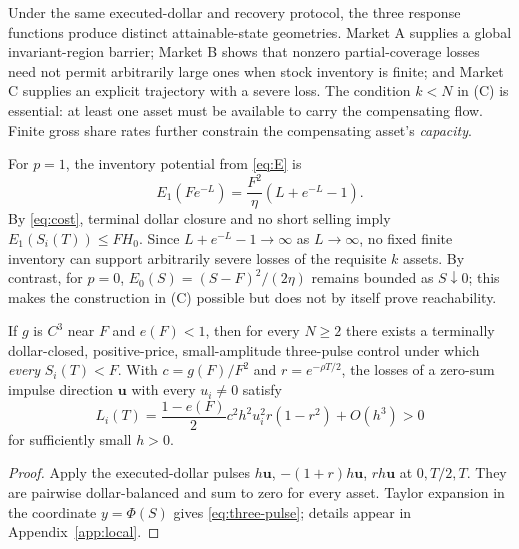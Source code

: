 \documentclass[review,hidelinks,onefignum,onetabnum]{siamonline250211}
\begin{document}
Under the same executed-dollar and recovery protocol, the three response functions produce distinct attainable-state geometries. Market A supplies a global invariant-region barrier; Market B shows that nonzero partial-coverage losses need not permit arbitrarily large ones when stock inventory is finite; and Market C supplies an explicit trajectory with a severe loss. The condition $k<N$ in (C) is essential: at least one asset must be available to carry the compensating flow. Finite gross share rates further constrain the compensating asset's \emph{capacity}.

For $p=1$, the inventory potential from \eqref{eq:E} is
\begin{equation}\label{eq:inventoryb}
E_1(Fe^{-L})=\frac{F^2}{\eta}\left(L+e^{-L}-1\right).
\end{equation}
By \eqref{eq:cost}, terminal dollar closure and no short selling imply $E_1(S_i(T))\le FH_0$. Since $L+e^{-L}-1\to\infty$ as $L\to\infty$, no fixed finite inventory can support arbitrarily severe losses of the requisite $k$ assets. By contrast, for $p=0$, $E_0(S)=(S-F)^2/(2\eta)$ remains bounded as $S\downarrow0$; this makes the construction in (C) possible but does not by itself prove reachability.

\begin{proposition}\label{prop:three-pulse}
If $g$ is $C^3$ near $F$ and $e(F)<1$, then for every $N\ge2$ there exists a terminally dollar-closed, positive-price, small-amplitude three-pulse control under which \emph{every} $S_i(T)<F$. With $c=g(F)/F^2$ and $r=e^{-\rho T/2}$, the losses of a zero-sum impulse direction $\bm u$ with every $u_i\ne0$ satisfy
\begin{equation}\label{eq:three-pulse}
L_i(T)=\frac{1-e(F)}2c^2h^2u_i^2r(1-r^2)+O(h^3)>0
\end{equation}
for sufficiently small $h>0$.
\end{proposition}
\begin{proof}
Apply the executed-dollar pulses $h\bm u$, $-(1+r)h\bm u$, $rh\bm u$ at $0,T/2,T$. They are pairwise dollar-balanced and sum to zero for every asset. Taylor expansion in the coordinate $y=\Phi(S)$ gives \eqref{eq:three-pulse}; details appear in Appendix~\ref{app:local}.
\end{proof}
\end{document}
